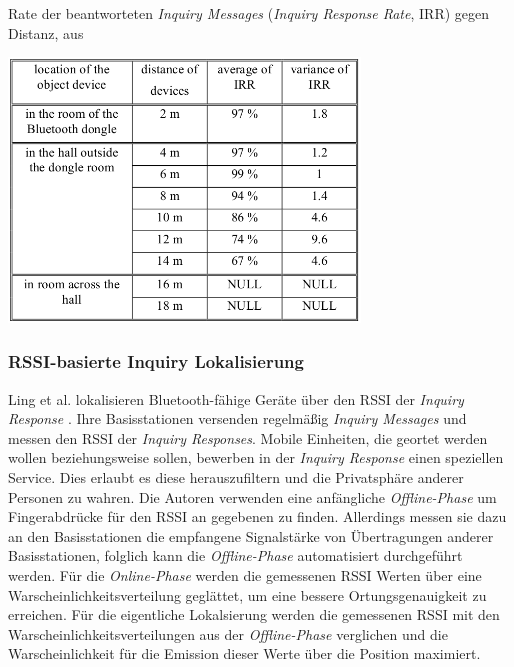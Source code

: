 \begin{table}[h]
  \centering
  \caption{Rate der beantworteten \emph{Inquiry Messages} (\emph{Inquiry Response Rate}, IRR) gegen Distanz, aus \cite{bargh2008indoor}}
	\includegraphics[width=0.7\textwidth]{images/irr.png}

  \label{table:irr}
\end{table}

\subsubsection{RSSI-basierte Inquiry Lokalisierung}
Ling et al. lokalisieren Bluetooth-fähige Geräte über den RSSI der \emph{Inquiry Response} \cite{ling2010inquiry}.
Ihre Basisstationen versenden regelmäßig \emph{Inquiry Messages} und messen den RSSI der \emph{Inquiry Responses}.
Mobile Einheiten, die geortet werden wollen beziehungsweise sollen, bewerben in der \emph{Inquiry Response} einen speziellen Service.
Dies erlaubt es diese herauszufiltern und die Privatsphäre anderer Personen zu wahren.
Die Autoren verwenden eine anfängliche \emph{Offline-Phase} um Fingerabdrücke für den RSSI an gegebenen zu finden.
Allerdings messen sie dazu an den Basisstationen die empfangene Signalstärke von Übertragungen anderer Basisstationen, folglich kann die \emph{Offline-Phase} automatisiert durchgeführt werden.
Für die \emph{Online-Phase} werden die gemessenen RSSI Werten über eine Warscheinlichkeitsverteilung geglättet, um eine bessere Ortungsgenauigkeit zu erreichen.
Für die eigentliche Lokalsierung werden die gemessenen RSSI mit den Warscheinlichkeitsverteilungen aus der \emph{Offline-Phase} verglichen und die Warscheinlichkeit für die Emission dieser Werte über die Position maximiert.

